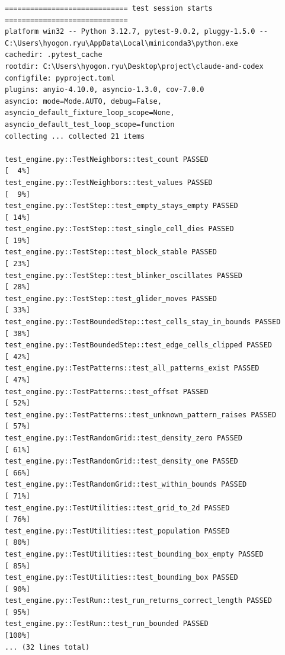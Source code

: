 \documentclass[11pt,a4paper]{article}
\begin{document}
\begin{lstlisting}
============================= test session starts =============================
platform win32 -- Python 3.12.7, pytest-9.0.2, pluggy-1.5.0 -- C:\Users\hyogon.ryu\AppData\Local\miniconda3\python.exe
cachedir: .pytest_cache
rootdir: C:\Users\hyogon.ryu\Desktop\project\claude-and-codex
configfile: pyproject.toml
plugins: anyio-4.10.0, asyncio-1.3.0, cov-7.0.0
asyncio: mode=Mode.AUTO, debug=False, asyncio_default_fixture_loop_scope=None, asyncio_default_test_loop_scope=function
collecting ... collected 21 items

test_engine.py::TestNeighbors::test_count PASSED                         [  4%]
test_engine.py::TestNeighbors::test_values PASSED                        [  9%]
test_engine.py::TestStep::test_empty_stays_empty PASSED                  [ 14%]
test_engine.py::TestStep::test_single_cell_dies PASSED                   [ 19%]
test_engine.py::TestStep::test_block_stable PASSED                       [ 23%]
test_engine.py::TestStep::test_blinker_oscillates PASSED                 [ 28%]
test_engine.py::TestStep::test_glider_moves PASSED                       [ 33%]
test_engine.py::TestBoundedStep::test_cells_stay_in_bounds PASSED        [ 38%]
test_engine.py::TestBoundedStep::test_edge_cells_clipped PASSED          [ 42%]
test_engine.py::TestPatterns::test_all_patterns_exist PASSED             [ 47%]
test_engine.py::TestPatterns::test_offset PASSED                         [ 52%]
test_engine.py::TestPatterns::test_unknown_pattern_raises PASSED         [ 57%]
test_engine.py::TestRandomGrid::test_density_zero PASSED                 [ 61%]
test_engine.py::TestRandomGrid::test_density_one PASSED                  [ 66%]
test_engine.py::TestRandomGrid::test_within_bounds PASSED                [ 71%]
test_engine.py::TestUtilities::test_grid_to_2d PASSED                    [ 76%]
test_engine.py::TestUtilities::test_population PASSED                    [ 80%]
test_engine.py::TestUtilities::test_bounding_box_empty PASSED            [ 85%]
test_engine.py::TestUtilities::test_bounding_box PASSED                  [ 90%]
test_engine.py::TestRun::test_run_returns_correct_length PASSED          [ 95%]
test_engine.py::TestRun::test_run_bounded PASSED                         [100%]
... (32 lines total)
\end{lstlisting}
\end{document}
